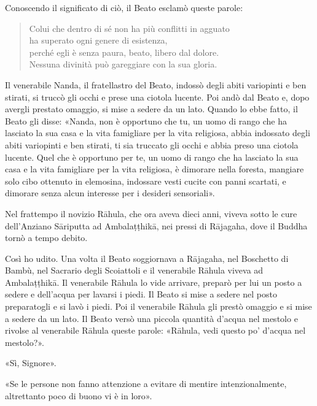 Conoscendo il significato di ciò, il Beato esclamò queste parole:


\begin{quote}
Colui che dentro di sé non ha più conflitti in agguato \\
ha superato ogni genere di esistenza, \\
perché egli è senza paura, beato, libero dal dolore. \\
Nessuna divinità può gareggiare con la sua gloria.
\end{quote}



 Il venerabile Nanda, il fratellastro del Beato, indossò
degli abiti variopinti e ben stirati, si truccò gli occhi e prese una
ciotola lucente. Poi andò dal Beato e, dopo avergli prestato omaggio, si
mise a sedere da un lato. Quando lo ebbe fatto, il Beato gli disse:
«Nanda, non è opportuno che tu, un uomo di rango che ha lasciato la sua
casa e la vita famigliare per la vita religiosa, abbia indossato degli
abiti variopinti e ben stirati, ti sia truccato gli occhi e abbia preso
una ciotola lucente. Quel che è opportuno per te, un uomo di rango che
ha lasciato la sua casa e la vita famigliare per la vita religiosa, è
dimorare nella foresta, mangiare solo cibo ottenuto in elemosina,
indossare vesti cucite con panni scartati, e dimorare senza alcun
interesse per i desideri sensoriali».




 Nel frattempo il novizio Rāhula, che ora aveva dieci
anni, viveva sotto le cure dell’Anziano Sāriputta ad Ambalaṭṭhikā, nei
pressi di Rājagaha, dove il Buddha tornò a tempo debito.


 Così ho udito. Una volta il Beato soggiornava a Rājagaha,
nel Boschetto di Bambù, nel Sacrario degli Scoiattoli e il venerabile
Rāhula viveva ad Ambalaṭṭhikā. Il venerabile Rāhula lo vide arrivare,
preparò per lui un posto a sedere e dell’acqua per lavarsi i piedi. Il
Beato si mise a sedere nel posto preparatogli e si lavò i piedi. Poi il
venerabile Rāhula gli prestò omaggio e si mise a sedere da un lato. Il
Beato versò una piccola quantità d’acqua nel mestolo e rivolse al
venerabile Rāhula queste parole: «Rāhula, vedi questo po’ d’acqua nel
mestolo?».


«Sì, Signore».


«Se le persone non fanno attenzione a evitare di mentire
intenzionalmente, altrettanto poco di buono vi è in loro».


